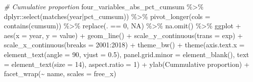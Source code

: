 \documentclass[10pt,landscape,a3paper]{article}
\newenvironment{Shaded}{\begin{snugshade}}{\end{snugshade}}
\newcommand{\AttributeTok}[1]{\textcolor[rgb]{0.77,0.63,0.00}{#1}}
\newcommand{\CommentTok}[1]{\textcolor[rgb]{0.56,0.35,0.01}{\textit{#1}}}
\newcommand{\ConstantTok}[1]{\textcolor[rgb]{0.00,0.00,0.00}{#1}}
\newcommand{\DecValTok}[1]{\textcolor[rgb]{0.00,0.00,0.81}{#1}}
\newcommand{\FloatTok}[1]{\textcolor[rgb]{0.00,0.00,0.81}{#1}}
\newcommand{\FunctionTok}[1]{\textcolor[rgb]{0.00,0.00,0.00}{#1}}
\newcommand{\NormalTok}[1]{#1}
\newcommand{\SpecialCharTok}[1]{\textcolor[rgb]{0.00,0.00,0.00}{#1}}
\newcommand{\StringTok}[1]{\textcolor[rgb]{0.31,0.60,0.02}{#1}}
\begin{document}
\begin{Shaded}
\begin{Highlighting}[]

\CommentTok{\# Cumulative proportion}
\NormalTok{four\_variables\_abs\_pct\_cumsum }\SpecialCharTok{\%\textgreater{}\%}
\NormalTok{  dplyr}\SpecialCharTok{::}\FunctionTok{select}\NormalTok{(}\FunctionTok{matches}\NormalTok{(}\StringTok{\textquotesingle{}year|pct\_cumsum\textquotesingle{}}\NormalTok{)) }\SpecialCharTok{\%\textgreater{}\%} 
  \FunctionTok{pivot\_longer}\NormalTok{(}\AttributeTok{cols =} \FunctionTok{contains}\NormalTok{(}\StringTok{\textquotesingle{}cumsum\textquotesingle{}}\NormalTok{)) }\SpecialCharTok{\%\textgreater{}\%} 
  \FunctionTok{replace}\NormalTok{(. }\SpecialCharTok{==} \DecValTok{0}\NormalTok{, }\ConstantTok{NA}\NormalTok{) }\SpecialCharTok{\%\textgreater{}\%}
  \FunctionTok{na.omit}\NormalTok{() }\SpecialCharTok{\%\textgreater{}\%} 
\NormalTok{  ggplot }\SpecialCharTok{+} \FunctionTok{aes}\NormalTok{(}\AttributeTok{x =}\NormalTok{ year, }\AttributeTok{y =}\NormalTok{ value) }\SpecialCharTok{+} \FunctionTok{geom\_line}\NormalTok{() }\SpecialCharTok{+}
  \FunctionTok{scale\_y\_continuous}\NormalTok{(}\AttributeTok{trans =} \StringTok{\textquotesingle{}exp\textquotesingle{}}\NormalTok{) }\SpecialCharTok{+}
  \FunctionTok{scale\_x\_continuous}\NormalTok{(}\AttributeTok{breaks =} \DecValTok{2001}\SpecialCharTok{:}\DecValTok{2018}\NormalTok{) }\SpecialCharTok{+} 
  \FunctionTok{theme\_bw}\NormalTok{() }\SpecialCharTok{+}
  \FunctionTok{theme}\NormalTok{(}\AttributeTok{axis.text.x =} \FunctionTok{element\_text}\NormalTok{(}\AttributeTok{angle =} \DecValTok{90}\NormalTok{, }\AttributeTok{vjust =} \FloatTok{0.5}\NormalTok{), }\AttributeTok{panel.grid.minor =} \FunctionTok{element\_blank}\NormalTok{(),}
        \AttributeTok{text =} \FunctionTok{element\_text}\NormalTok{(}\AttributeTok{size =} \DecValTok{14}\NormalTok{), }\AttributeTok{aspect.ratio =} \DecValTok{1}\NormalTok{) }\SpecialCharTok{+}
  \FunctionTok{ylab}\NormalTok{(}\StringTok{\textquotesingle{}Cummulative proportion\textquotesingle{}}\NormalTok{) }\SpecialCharTok{+}
  \FunctionTok{facet\_wrap}\NormalTok{(}\SpecialCharTok{\textasciitilde{}}\NormalTok{ name, }\AttributeTok{scales =} \StringTok{\textquotesingle{}free\_x\textquotesingle{}}\NormalTok{)}
\end{Highlighting}
\end{Shaded}
\end{document}
